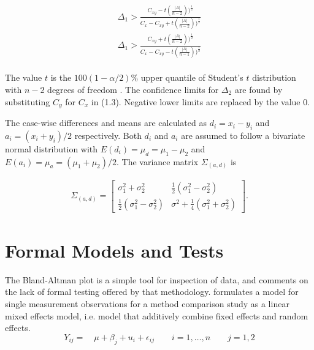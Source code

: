 \documentclass[12pt, a4paper]{report}
\theoremstyle{plain}
\theoremstyle{definition}
\theoremstyle{remark}
\begin{document}
	\begin{eqnarray}
	\Delta_{1} > \frac{C_{xy}-
		t(\frac{|A|}{n-2}))^{\frac{1}{2}}}{C_{x}-C_{xy}+
		t(\frac{|A|}{n-2}))^{\frac{1}{2}}} \\
	\Delta_{1} > \frac{C_{xy}+
		t(\frac{|A|}{n-2}))^{\frac{1}{2}}}{C_{x}-C_{xy}-
		t(\frac{|A|}{n-1}))^{\frac{1}{2}}} \nonumber
	\end{eqnarray}
	\\ The value $t$ is the $100(1-\alpha/2)\%$ upper quantile of
	Student's $t$ distribution with $n-2$ degrees of freedom
	\citep{Kinsella}. The confidence limits for $\Delta_{2}$ are found by substituting $C_{y}$ for $C_{x}$ in (1.3).
	Negative lower limits are replaced by the value $0$.
	
	
	
	
	The case-wise differences and means are calculated as $d_{i} =
	x_{i}-y_{i}$ and $a_{i} = (x_{i}+y_{i})/2$  respectively. Both
	$d_{i}$ and $a_{i}$ are assumed to follow a bivariate normal
	distribution with $E(d_{i})= \mu_{d} = \mu_{1} - \mu_{2}$ and
	$E(a_{i})= \mu_{a} = (\mu_{1} + \mu_{2})/2$. The variance matrix
	$\Sigma_{(a,d)}$ is
	
	\begin{eqnarray}
	\Sigma_{(a,d)}= \left[\begin{matrix}
	\sigma^{2}_{1}+\sigma^{2}_{2}&\frac{1}{2}(\sigma^{2}_{1}-\sigma^{2}_{2})\\
	\frac{1}{2}(\sigma^{2}_{1}-\sigma^{2}_{2})&\sigma^{2}+
	\frac{1}{4}(\sigma^{2}_{1}+\sigma^{2}_{2})
	\end{matrix} \right].
	\end{eqnarray}
	
	
	
	
	
	\section{Formal Models and Tests}
	The Bland-Altman plot is a simple tool for inspection of data, and
	\citet{Kinsella} comments on the lack of formal testing offered by
	that methodology. \citet{Kinsella} formulates a model for
	single measurement observations for a method comparison study as a
	linear mixed effects model, i.e. model that additively combine
	fixed effects and random effects.
	\[
	Y_{ij} =\quad \mu + \beta_{j} + u_{i} + \epsilon_{ij} \qquad i = 1,\dots,n
	\qquad j=1,2\]
	
\end{document}
